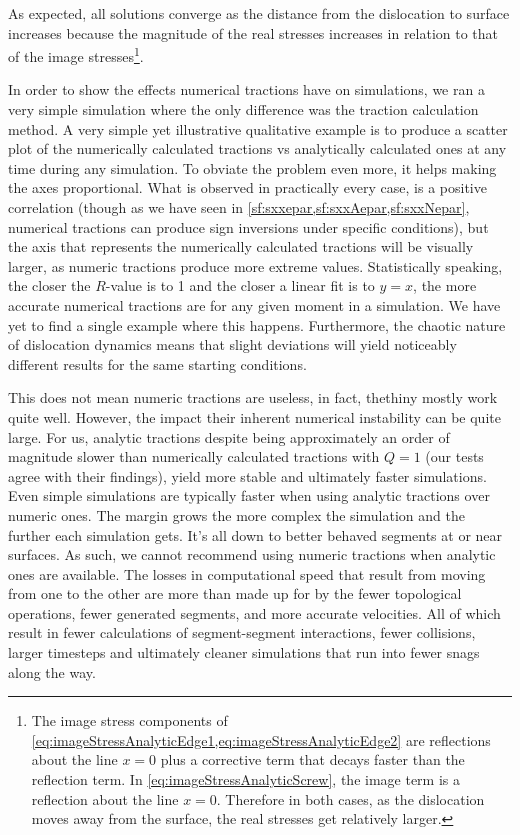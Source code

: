 \documentclass[11pt]{iopart}
\begin{document}
As expected, all solutions converge as the distance from the dislocation to surface increases because the magnitude of the real stresses increases in relation to that of the image stresses\footnote{The image stress components of \cref{eq:imageStressAnalyticEdge1,eq:imageStressAnalyticEdge2} are reflections about the line $x=0$ plus a corrective term that decays faster than the reflection term. In \cref{eq:imageStressAnalyticScrew}, the image term is a reflection about the line $x=0$. Therefore in both cases, as the dislocation moves away from the surface, the real stresses get relatively larger.}.

In order to show the effects numerical tractions have on simulations, we ran a very simple simulation where the only difference was the traction calculation method. A very simple yet illustrative qualitative example is to produce a scatter plot of the numerically calculated tractions vs analytically calculated ones at any time during any simulation. To obviate the problem even more, it helps making the axes proportional. What is observed in practically every case, is a positive correlation (though as we have seen in \cref{sf:sxxepar,sf:sxxAepar,sf:sxxNepar}, numerical tractions can produce sign inversions under specific conditions), but the axis that represents the numerically calculated tractions will be visually larger, as numeric tractions produce more extreme values. Statistically speaking, the closer the $R$-value is to 1 and the closer a linear fit is to $y=x$, the more accurate numerical tractions are for any given moment in a simulation. We have yet to find a single example where this happens. Furthermore, the chaotic nature of dislocation dynamics means that slight deviations will yield noticeably different results for the same starting conditions.

This does not mean numeric tractions are useless, in fact, thethiny mostly work quite well. However, the impact their inherent numerical instability can be quite large. For us, analytic tractions despite being approximately an order of magnitude slower than numerically calculated tractions with $Q = 1$ \cite{Queyreau} (our tests agree with their findings), yield more stable and ultimately faster simulations. Even simple simulations are typically faster when using analytic tractions over numeric ones. The margin grows the more complex the simulation and the further each simulation gets. It's all down to better behaved segments at or near surfaces. As such, we cannot recommend using numeric tractions when analytic ones are available. The losses in computational speed that result from moving from one to the other are more than made up for by the fewer topological operations, fewer generated segments, and more accurate velocities. All of which result in fewer calculations of segment-segment interactions, fewer collisions, larger timesteps and ultimately cleaner simulations that run into fewer snags along the way.
\end{document}
